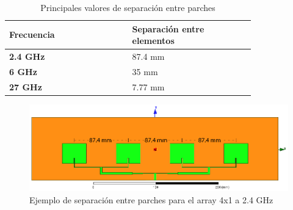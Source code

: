 \begin{table}[H]
   
   \small %
   \centering %
   \begin{tabular}{m{0.4\linewidth}m{0.4\linewidth}} %
   \toprule[\heavyrulewidth]\toprule[\heavyrulewidth]
   \textbf{Frecuencia} & \textbf{Separación entre elementos}  \\ 
   \midrule
   \textbf{2.4 GHz} & 87.4 mm  \\
   \textbf{6 GHz} & 35 mm  \\
   \textbf{27 GHz} & 7.77 mm  \\
   \bottomrule[\heavyrulewidth] 
   \end{tabular}
   \caption{Principales valores de separación entre parches} 
   \label{tab:sepparches}
\end{table}

\begin{figure}[h]
    \centering
        \includegraphics[width=\textwidth]{archivos/array/separacionparches}
        \caption{Ejemplo de separación entre parches para el array 4x1 a 2.4 GHz}
        \label{fig:ejemploseparación}
\end{figure}

